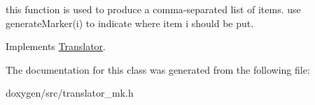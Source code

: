 this function is used to produce a comma-\/separated list of items. use generate\+Marker(i) to indicate where item i should be put. 

Implements \mbox{\hyperlink{class_translator}{Translator}}.



The documentation for this class was generated from the following file\+:\begin{DoxyCompactItemize}
\item 
doxygen/src/translator\+\_\+mk.\+h\end{DoxyCompactItemize}
